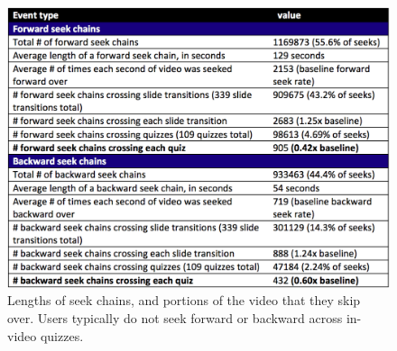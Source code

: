\documentclass{sigchi}
\begin{document}




\begin{figure}
\includegraphics[width=1.0\columnwidth]{table-of-seeks}
\caption{Lengths of seek chains, and portions of the video that they skip over. Users typically do not seek forward or backward across in-video quizzes.}
\label{fig:table-of-seeks}
\end{figure}
\end{document}
